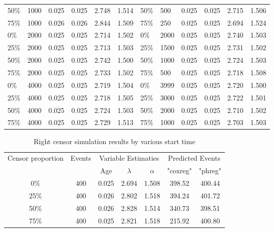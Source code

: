 \documentclass[12pt,letterpaper]{article}
\begin{document}
\begin{table}[!htbp]
\begin{tabular}{@{}C{1.8cm}lllll||C{1.8cm}lllll@{}}
 		50\% & 1000   & 0.025  & 0.025 & 2.748 & 1.514 & 50\%  & 500  & 0.025 & 0.025 & 2.715 & 1.506 \\
 		75\% & 1000   & 0.026  & 0.026 & 2.844 & 1.509 & 75\%  & 250  & 0.025 & 0.025 & 2.694 & 1.524 \\
 		0\%  & 2000   & 0.025  & 0.025 & 2.714 & 1.502 & 0\%   & 2000 & 0.025 & 0.025 & 2.740 & 1.503 \\
 		25\% & 2000   & 0.025  & 0.025 & 2.713 & 1.503 & 25\%  & 1500 & 0.025 & 0.025 & 2.731 & 1.502 \\
 		50\% & 2000   & 0.025  & 0.025 & 2.742 & 1.500 & 50\%  & 1000 & 0.025 & 0.025 & 2.724 & 1.503 \\
 		75\% & 2000   & 0.025  & 0.025 & 2.733 & 1.502 & 75\%  & 500  & 0.025 & 0.025 & 2.718 & 1.508 \\
 		0\%  & 4000   & 0.025  & 0.025 & 2.719 & 1.504 & 0\%   & 3999 & 0.025 & 0.025 & 2.720 & 1.500 \\
 		25\% & 4000   & 0.025  & 0.025 & 2.718 & 1.505 & 25\%  & 3000 & 0.025 & 0.025 & 2.722 & 1.501 \\
 		50\% & 4000   & 0.025  & 0.025 & 2.724 & 1.503 & 50\%  & 2000 & 0.025 & 0.025 & 2.710 & 1.502 \\
 		75\% & 4000  & 0.025 & 0.025  & 2.729 & 1.513 & 75\%  & 1000  & 0.025  & 0.025 & 2.703 & 1.503 \\ \bottomrule
 	\end{tabular}
 	\label{tab:rightcensor}%
 \end{table}


 \begin{table}[htbp]
 	\renewcommand{\arraystretch}{1.5}
 	\centering
 	\caption{Right censor simulation results by various start time}
 	\begin{tabular}{ccccccc}
 		\toprule
 		\multicolumn{1}{c}{\multirow{2}{1.5cm}{Censor proportion}}  & \multirow{2}[4]{*}{Events} & \multicolumn{3}{c}{Variable Estimaties} & \multicolumn{2}{c}{Predicted Events} \\ \cline{3-7}
 		&       & Age   & $\lambda$ & $\alpha$ & "coxreg" & "phreg" \\
 		\midrule
 		0\%   & 400   & 0.025 & 2.694 & 1.508 & 398.52 & 400.44 \\
 		25\%  & 400   & 0.026 & 2.802 & 1.518 & 394.24 & 401.72 \\
 		50\%  & 400   & 0.026 & 2.828 & 1.514 & 340.73 & 398.51 \\
 		75\%  & 400   & 0.025 & 2.821 & 1.518 & 215.92 & 400.80 \\
 		\bottomrule
 	\end{tabular}%
 	\label{tab:right2}%
 \end{table}%
\end{document}
